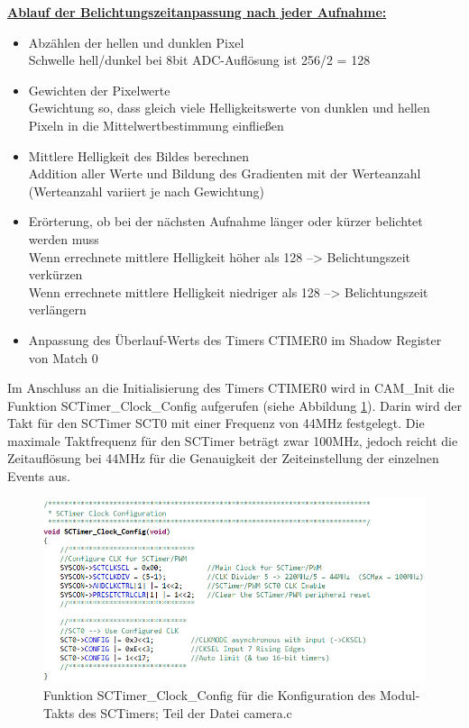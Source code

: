 \newpage
\textbf{\underline{Ablauf der Belichtungszeitanpassung nach jeder Aufnahme:}} 
\begin{itemize}
\item Abzählen der hellen und dunklen Pixel\\
	Schwelle hell/dunkel bei 8bit ADC-Auflösung ist 256/2 = 128
\item Gewichten der Pixelwerte\\
	Gewichtung so, dass gleich viele Helligkeitswerte von dunklen und hellen Pixeln in die Mittelwertbestimmung einfließen
\item Mittlere Helligkeit des Bildes berechnen\\
	Addition aller Werte und Bildung des Gradienten mit der Werteanzahl (Werteanzahl variiert je nach Gewichtung)
\item Erörterung, ob bei der nächsten Aufnahme länger oder kürzer belichtet werden muss\\
	Wenn errechnete mittlere Helligkeit höher als 128 --> Belichtungszeit verkürzen\\
	Wenn errechnete mittlere Helligkeit niedriger als 128 --> Belichtungszeit verlängern
\item Anpassung des Überlauf-Werts des Timers CTIMER0 im Shadow Register von Match 0\vspace{18pt}
\end{itemize}

Im Anschluss an die Initialisierung des Timers CTIMER0 wird in \glqq{}CAM\_Init\grqq{} die Funktion \glqq{}SCTimer\_Clock\_Config\grqq{} aufgerufen (siehe Abbildung \ref{fig:SCTClockConfig}). Darin wird der Takt für den SCTimer SCT0 mit einer Frequenz von 44MHz festgelegt. Die maximale Taktfrequenz für den SCTimer beträgt zwar 100MHz, jedoch reicht die Zeitauflösung bei 44MHz für die Genauigkeit der Zeiteinstellung der einzelnen Events aus.

\begin{figure}[H] %
\includegraphics[width=\textwidth]{sec7/images/code/SCTimerClockConfig} 
\centering
\captionsetup{width=.95\textwidth}
\caption[Funktion \glqq{}SCTimer\_Clock\_Config\grqq{} aus der Datei \glqq{}camera.c\grqq{}]{Funktion \glqq{}SCTimer\_Clock\_Config\grqq{} für die Konfiguration des Modul-Takts des SCTimers; Teil der Datei \glqq{}camera.c\grqq{}}\centering
\label{fig:SCTClockConfig}
\end{figure}

